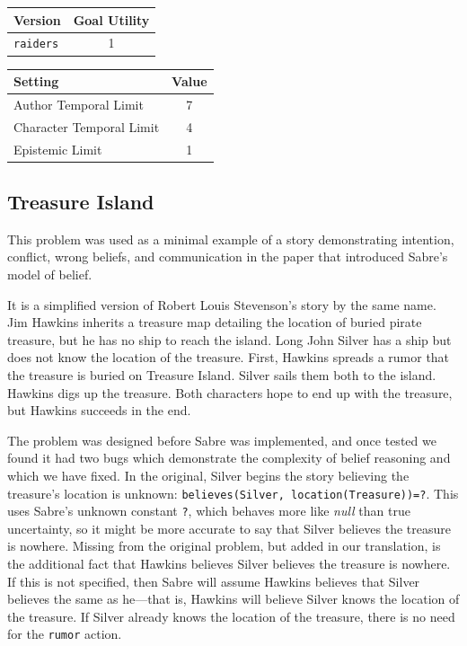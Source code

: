 \documentclass{nilreport}
\makeatletter
\renewcommand{\bibentry}[1]{\nocite{#1}{\frenchspacing\@nameuse{BR@r@#1\@extra@b@citeb}}}
\makeatother
\begin{document}
\medskip{}

\begin{center}
\begin{tabular}[t]{|l|c|}
\hline 
\textbf{Version} & \textbf{Goal Utility}\tabularnewline
\hline 
\hline 
\texttt{raiders} & 1\tabularnewline
\hline 
\end{tabular}\textbf{\quad{}}%
\begin{tabular}[t]{|l|c|}
\hline 
\textbf{Setting} & \textbf{Value}\tabularnewline
\hline 
\hline 
Author Temporal Limit & 7\tabularnewline
\hline 
Character Temporal Limit & 4\tabularnewline
\hline 
Epistemic Limit & 1\tabularnewline
\hline 
\end{tabular}
\par\end{center}

\subsection{Treasure Island}

This problem was used as a minimal example of a story demonstrating
intention, conflict, wrong beliefs, and communication in the paper
that introduced Sabre's model of belief.

\begin{quote}
	\bibentry{shirvani2017possible}
\end{quote}

\noindent It is a simplified version of Robert Louis Stevenson's story
by the same name. Jim Hawkins inherits a treasure map detailing the
location of buried pirate treasure, but he has no ship to reach the
island. Long John Silver has a ship but does not know the location
of the treasure. First, Hawkins spreads a rumor that the treasure
is buried on Treasure Island. Silver sails them both to the island.
Hawkins digs up the treasure. Both characters hope to end up with
the treasure, but Hawkins succeeds in the end.

The problem was designed before Sabre was implemented, and once tested
we found it had two bugs which demonstrate the complexity of belief
reasoning and which we have fixed. In the original, Silver begins
the story believing the treasure's location is unknown: \texttt{believes(Silver,
location(Treasure))=?}. This uses Sabre's unknown constant \texttt{?},
which behaves more like \emph{null} than true uncertainty, so it might
be more accurate to say that Silver believes the treasure is nowhere.
Missing from the original problem, but added in our translation, is
the additional fact that Hawkins believes Silver believes the treasure
is nowhere. If this is not specified, then Sabre will assume Hawkins
believes that Silver believes the same as he---that is, Hawkins will
believe Silver knows the location of the treasure. If Silver already
knows the location of the treasure, there is no need for the \texttt{rumor}
action.
\end{document}
